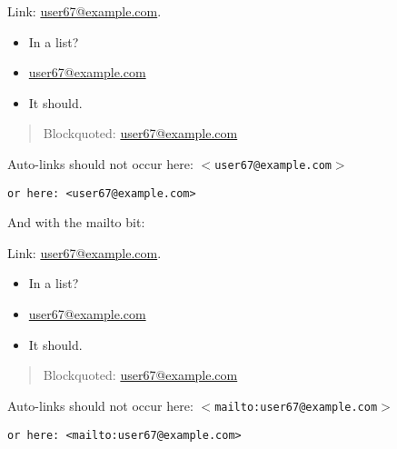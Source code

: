 
\def\mytitle{Email Test}

Link: \href{mailto:user67@example.com}{user67@example.com}.

\begin{itemize}
\item In a list?

\item \href{mailto:user67@example.com}{user67@example.com}

\item It should.

\end{itemize}

\begin{quote}

Blockquoted: \href{mailto:user67@example.com}{user67@example.com}
\end{quote}

Auto-links should not occur here: \texttt{$<$user67@example.com$>$}

\begin{verbatim}
or here: <user67@example.com>
\end{verbatim}


And with the mailto bit:

Link: \href{mailto:user67@example.com}{user67@example.com}.

\begin{itemize}
\item In a list?

\item \href{mailto:user67@example.com}{user67@example.com}

\item It should.

\end{itemize}

\begin{quote}

Blockquoted: \href{mailto:user67@example.com}{user67@example.com}
\end{quote}

Auto-links should not occur here: \texttt{$<$mailto:user67@example.com$>$}

\begin{verbatim}
or here: <mailto:user67@example.com>
\end{verbatim}





